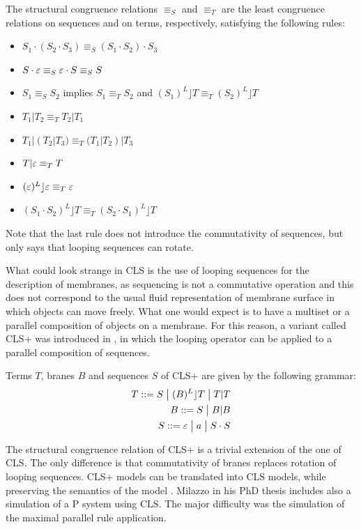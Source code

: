 \begin{definition}
  The structural congruence relations $\equiv_S$ and $\equiv_T$ are the least congruence relations on sequences and on terms, respectively, satisfying the following rules:
  \begin{itemize}
    \item $S_1\cdot(S_2\cdot S_3)\equiv_S (S_1\cdot S_2)\cdot S_3$
    \item $S\cdot\varepsilon\equiv_S \varepsilon\cdot S\equiv_S S$
    \item $S_1\equiv_S S_2$ implies $S_1\equiv_T S_2$ and $(S_1)^L\rfloor T\equiv_T (S_2)^L\rfloor T$
    \item $T_1|T_2\equiv_T T_2|T_1$
    \item $T_1|(T_2|T_3)\equiv_T (T_1|T_2)|T_3$
    \item $T|\varepsilon\equiv_T T$
    \item $(\varepsilon)^L\rfloor\varepsilon\equiv_T\varepsilon$
    \item $(S_1\cdot S_2)^L\rfloor T\equiv_T (S_2\cdot S_1)^L\rfloor T$
  \end{itemize}
\end{definition}

Note that the last rule does not introduce the commutativity of sequences, but only says that looping sequences can rotate.

What could look strange in CLS is the use of looping sequences for the description of membranes, as sequencing is not a commutative operation and this does not correspond to the usual fluid representation of membrane surface in which objects can move freely. What one would expect is to have a multiset or a parallel composition of objects on a membrane. For this reason, a variant called CLS+ was introduced in \cite{Milazzo07CLS}, in which the looping operator can be applied
to a parallel composition of sequences.

\begin{definition}
  Terms $T$, branes $B$ and sequences $S$ of CLS+ are given by the following grammar:
  \begin{align*}
    T ::= S \;\big|\; (B)^L\rfloor T \;\big|\; T|T\\
    B ::= S \;\big|\; B|B\\
    S ::= \varepsilon \;\big|\; a \;\big|\; S\cdot S
  \end{align*}
\end{definition}

The structural congruence relation of CLS+ is a trivial extension of the one of CLS. The only difference is that commutativity of branes replaces rotation of looping sequences. CLS+ models can be translated into CLS models, while preserving the semantics of the model \cite{Barbuti07CLS}. Milazzo in his PhD thesis \cite{Milazzo07CLS} includes also a simulation of a P system using CLS. The major difficulty was the simulation of the maximal parallel rule application.




